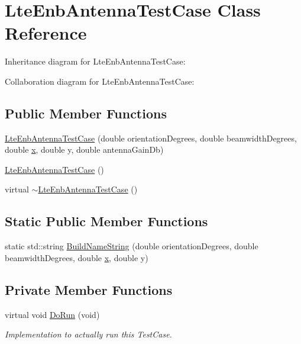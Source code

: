 \hypertarget{classLteEnbAntennaTestCase}{}\section{Lte\+Enb\+Antenna\+Test\+Case Class Reference}
\label{classLteEnbAntennaTestCase}


Inheritance diagram for Lte\+Enb\+Antenna\+Test\+Case\+:


Collaboration diagram for Lte\+Enb\+Antenna\+Test\+Case\+:
\subsection*{Public Member Functions}
\begin{DoxyCompactItemize}
\item 
\hyperlink{classLteEnbAntennaTestCase_a658c152325dc77cce0d9ec64b89cbbd9}{Lte\+Enb\+Antenna\+Test\+Case} (double orientation\+Degrees, double beamwidth\+Degrees, double \hyperlink{lte__link__budget__x2__handover__measures_8m_a9336ebf25087d91c818ee6e9ec29f8c1}{x}, double y, double antenna\+Gain\+Db)
\item 
\hyperlink{classLteEnbAntennaTestCase_a419c7dbdc43647cafbed2e574edb2bd2}{Lte\+Enb\+Antenna\+Test\+Case} ()
\item 
virtual \hyperlink{classLteEnbAntennaTestCase_a5bcd08dcea8070d81b8daa3937040b0f}{$\sim$\+Lte\+Enb\+Antenna\+Test\+Case} ()
\end{DoxyCompactItemize}
\subsection*{Static Public Member Functions}
\begin{DoxyCompactItemize}
\item 
static std\+::string \hyperlink{classLteEnbAntennaTestCase_a19a8c8d811432028214a80217579b043}{Build\+Name\+String} (double orientation\+Degrees, double beamwidth\+Degrees, double \hyperlink{lte__link__budget__x2__handover__measures_8m_a9336ebf25087d91c818ee6e9ec29f8c1}{x}, double y)
\end{DoxyCompactItemize}
\subsection*{Private Member Functions}
\begin{DoxyCompactItemize}
\item 
virtual void \hyperlink{classLteEnbAntennaTestCase_a6120b567186fa3218fdaa1712399079e}{Do\+Run} (void)
\begin{DoxyCompactList}\small\item\em Implementation to actually run this Test\+Case. \end{DoxyCompactList}\end{DoxyCompactItemize}
